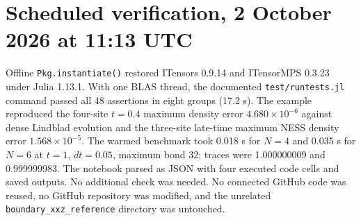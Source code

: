 \documentclass[11pt]{article}
\begin{document}
\section*{Scheduled verification, 2 October 2026 at 11:13 UTC}
Offline
\texttt{Pkg.instantiate()} restored ITensors 0.9.14 and ITensorMPS 0.3.23
under Julia 1.13.1. With one BLAS thread, the documented
\texttt{test/runtests.jl} command passed all 48 assertions in eight groups
(17.2 s). The example reproduced the four-site $t=0.4$ maximum density
error $4.680\times10^{-6}$ against dense Lindblad evolution and the
three-site late-time maximum NESS density error $1.568\times10^{-5}$.
The warmed benchmark took 0.018 s for $N=4$ and 0.035 s for $N=6$
at $t=1$, $dt=0.05$, maximum bond 32; traces were 1.000000009 and
0.999999983. The notebook parsed as JSON with four executed code cells
and saved outputs. No additional check was needed. No connected GitHub
code was reused, no GitHub repository was modified, and the unrelated
\texttt{boundary\_xxz\_reference} directory was untouched.
\end{document}
